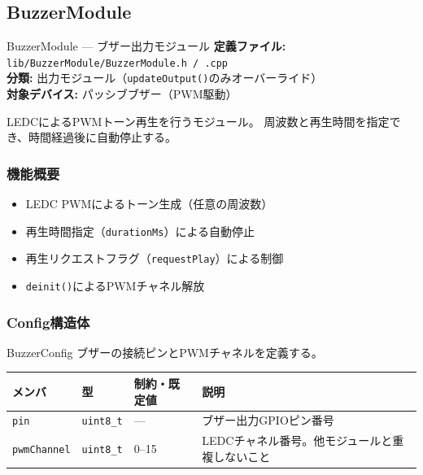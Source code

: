 \subsection{BuzzerModule}

\begin{apibox}{BuzzerModule --- ブザー出力モジュール}
\textbf{定義ファイル:} \texttt{lib/BuzzerModule/BuzzerModule.h / .cpp}\\
\textbf{分類:} 出力モジュール（\texttt{updateOutput()}のみオーバーライド）\\
\textbf{対象デバイス:} パッシブブザー（PWM駆動）

LEDCによるPWMトーン再生を行うモジュール。
周波数と再生時間を指定でき、時間経過後に自動停止する。
\end{apibox}

\subsubsection{機能概要}

\begin{itemize}
    \item LEDC PWMによるトーン生成（任意の周波数）
    \item 再生時間指定（\texttt{durationMs}）による自動停止
    \item 再生リクエストフラグ（\texttt{requestPlay}）による制御
    \item \texttt{deinit()}によるPWMチャネル解放
\end{itemize}

\subsubsection{Config構造体}

\begin{funcblock}{BuzzerConfig}
ブザーの接続ピンとPWMチャネルを定義する。

\begin{longtable}{l l l p{5.0cm}}
\toprule
\textbf{メンバ} & \textbf{型} & \textbf{制約・既定値} & \textbf{説明} \\
\midrule
\endhead
\texttt{pin}        & \texttt{uint8\_t} & ---         & ブザー出力GPIOピン番号 \\
\texttt{pwmChannel} & \texttt{uint8\_t} & 0--15       & LEDCチャネル番号。他モジュールと重複しないこと \\
\bottomrule
\end{longtable}
\end{funcblock}

